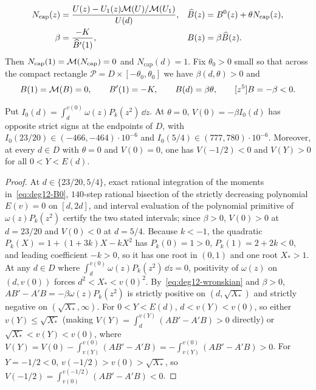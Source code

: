 \[
  \begin{aligned}
    N_{\mathrm{cap}}(z) &= \frac{U(z)-U_1(z)\mathcal{M}(U)/\mathcal{M}(U_1)}{U(d)}, & \widehat B(z) &= B^0(z) + \theta N_{\mathrm{cap}}(z),\\
    \beta &= \frac{-K}{\widehat B'(1)}, & B(z) &= \beta\widehat B(z).
  \end{aligned}
\]
Then $N_{\mathrm{cap}}(1)=\mathcal{M}(N_{\mathrm{cap}})=0$ and $N_{\mathrm{cap}}(d)=1$. Fix $\theta_0>0$ small so that across the compact rectangle $\mathcal{P}=D\times[-\theta_0,\theta_0]$ we have $\beta(d,\theta)>0$ and
\begin{equation}\label{eq:deg12-B-conds}
  B(1)=\mathcal{M}(B)=0,\qquad B'(1)=-K,\qquad B(d)=\beta\theta,\qquad [z^5]B=-\beta<0.
\end{equation}

\begin{lemma}\label{lem:deg12-radius}
Put $I_0(d)=\int_d^{v(0)}\omega(z)P_k(z^2)\,\dd z$. At $\theta=0$, $V(0)=-\beta I_0(d)$ has opposite strict signs at the endpoints of $D$, with $I_0(23/20)\in(-466,-464)\cdot 10^{-6}$ and $I_0(5/4)\in(777,780)\cdot 10^{-6}$. Moreover, at every $d\in D$ with $\theta=0$ and $V(0)=0$, one has $V(-1/2)<0$ and $V(Y)>0$ for all $0<Y<E(d)$.
\end{lemma}

\begin{proof}
At $d\in\{23/20,5/4\}$, exact rational integration of the moments in~\eqref{eq:deg12-B0}, $140$-step rational bisection of the strictly decreasing polynomial $E(v)=0$ on $[d,2d]$, and interval evaluation of the polynomial primitive of $\omega(z)P_k(z^2)$ certify the two stated intervals; since $\beta>0$, $V(0)>0$ at $d=23/20$ and $V(0)<0$ at $d=5/4$. Because $k<-1$, the quadratic $P_k(X)=1+(1+3k)X-kX^2$ has $P_k(0)=1>0$, $P_k(1)=2+2k<0$, and leading coefficient $-k>0$, so it has one root in $(0,1)$ and one root $X_*>1$. At any $d\in D$ where $\int_d^{v(0)}\omega(z)P_k(z^2)\,\dd z=0$, positivity of $\omega(z)$ on $(d,v(0))$ forces $d^2<X_*<v(0)^2$. By~\eqref{eq:deg12-wronskian} and $\beta>0$, $AB'-A'B=-\beta\omega(z)P_k(z^2)$ is strictly positive on $(d,\sqrt{X_*})$ and strictly negative on $(\sqrt{X_*},\infty)$. For $0<Y<E(d)$, $d<v(Y)<v(0)$, so either $v(Y)\le\sqrt{X_*}$ (making $V(Y)=\int_d^{v(Y)}(AB'-A'B)>0$ directly) or $\sqrt{X_*}<v(Y)<v(0)$, where $V(Y)=V(0)-\int_{v(Y)}^{v(0)}(AB'-A'B)=-\int_{v(Y)}^{v(0)}(AB'-A'B)>0$. For $Y=-1/2<0$, $v(-1/2)>v(0)>\sqrt{X_*}$, so $V(-1/2)=\int_{v(0)}^{v(-1/2)}(AB'-A'B)<0$.
\end{proof}

